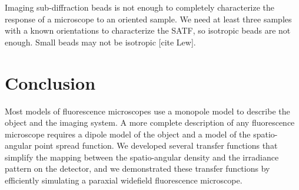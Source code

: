 \documentclass[]{osa-article}
\begin{document}
Imaging sub-diffraction beads is not enough to completely characterize the
response of a microscope to an oriented sample. We need at least three samples
with a known orientations to characterize the SATF, so isotropic beads are not
enough. Small beads may not be isotropic [cite Lew].

\section{Conclusion}
Most models of fluorescence microscopes use a monopole model to describe the
object and the imaging system. A more complete description of any fluorescence
microscope requires a dipole model of the object and a model of the
spatio-angular point spread function. We developed several transfer functions
that simplify the mapping between the spatio-angular density and the irradiance
pattern on the detector, and we demonstrated these transfer functions by
efficiently simulating a paraxial widefield fluorescence microscope.




\appendix
\end{document}
